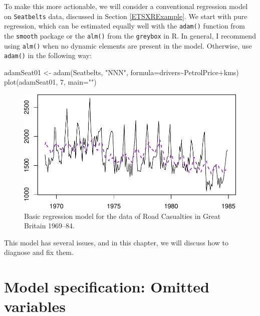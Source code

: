 \documentclass[
]{book}
\newenvironment{Shaded}{\begin{snugshade}}{\end{snugshade}}
\newcommand{\AttributeTok}[1]{\textcolor[rgb]{0.77,0.63,0.00}{#1}}
\newcommand{\DecValTok}[1]{\textcolor[rgb]{0.00,0.00,0.81}{#1}}
\newcommand{\FunctionTok}[1]{\textcolor[rgb]{0.00,0.00,0.00}{#1}}
\newcommand{\NormalTok}[1]{#1}
\newcommand{\OtherTok}[1]{\textcolor[rgb]{0.56,0.35,0.01}{#1}}
\newcommand{\SpecialCharTok}[1]{\textcolor[rgb]{0.00,0.00,0.00}{#1}}
\newcommand{\StringTok}[1]{\textcolor[rgb]{0.31,0.60,0.02}{#1}}
\theoremstyle{definition}
\theoremstyle{definition}
\theoremstyle{definition}
\theoremstyle{definition}
\theoremstyle{remark}
\begin{document}
To make this more actionable, we will consider a conventional regression model on \texttt{Seatbelts} data, discussed in Section \ref{ETSXRExample}. We start with pure regression, which can be estimated equally well with the \texttt{adam()} function from the \texttt{smooth} package or the \texttt{alm()} from the \texttt{greybox} in R. In general, I recommend using \texttt{alm()} when no dynamic elements are present in the model. Otherwise, use \texttt{adam()} in the following way:

\begin{Shaded}
\begin{Highlighting}[]
\NormalTok{adamSeat01 }\OtherTok{\textless{}{-}} \FunctionTok{adam}\NormalTok{(Seatbelts, }\StringTok{"NNN"}\NormalTok{,}
                   \AttributeTok{formula=}\NormalTok{drivers}\SpecialCharTok{\textasciitilde{}}\NormalTok{PetrolPrice}\SpecialCharTok{+}\NormalTok{kms)}
\FunctionTok{plot}\NormalTok{(adamSeat01, }\DecValTok{7}\NormalTok{, }\AttributeTok{main=}\StringTok{""}\NormalTok{)}
\end{Highlighting}
\end{Shaded}

\begin{figure}
\centering
\includegraphics{Svetunkov--2022----ADAM_files/figure-latex/adamSeat01-1.pdf}
\caption{\label{fig:adamSeat01}Basic regression model for the data of Road Casualties in Great Britain 1969--84.}
\end{figure}

This model has several issues, and in this chapter, we will discuss how to diagnose and fix them.

\hypertarget{diagnosticsOmitted}{%
\section{Model specification: Omitted variables}\label{diagnosticsOmitted}}
\end{document}
